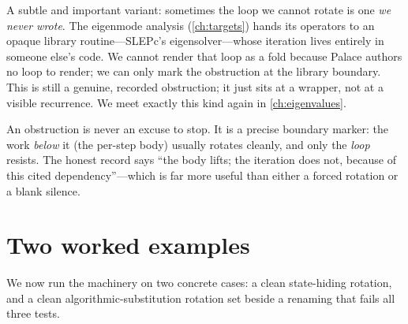 A subtle and important variant: sometimes the loop we cannot rotate is one
\emph{we never wrote}. The eigenmode analysis (\cref{ch:targets}) hands its operators
to an opaque library routine---SLEPc's eigensolver---whose iteration lives entirely
in someone else's code. We cannot render that loop as a fold because Palace authors
no loop to render; we can only mark the obstruction at the library boundary. This
is still a genuine, recorded obstruction; it just sits at a wrapper, not at a
visible recurrence. We meet exactly this kind again in \cref{ch:eigenvalues}.

\begin{remark}
An obstruction is never an excuse to stop. It is a precise boundary marker: the
work \emph{below} it (the per-step body) usually rotates cleanly, and only the
\emph{loop} resists. The honest record says ``the body lifts; the iteration does
not, because of this cited dependency''---which is far more useful than either a
forced rotation or a blank silence.
\end{remark}

\section{Two worked examples}

We now run the machinery on two concrete cases: a clean state-hiding rotation, and
a clean algorithmic-substitution rotation set beside a renaming that fails all
three tests.

